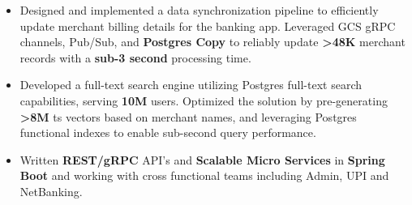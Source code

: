 \documentclass[10pt,a4paper,ragged2e]{classes/altacv}
\begin{document}
\tagline{ }

\begin{fullwidth}
\makecvheader
\end{fullwidth}





\begin{itemize}[itemsep=6pt]
\normalsize
\item Designed and implemented a data synchronization pipeline to efficiently update merchant billing details for the banking app. Leveraged GCS gRPC channels, Pub/Sub, and \textbf{Postgres Copy} to reliably update \textbf{>48K} merchant records with a \textbf{sub-3 second} processing time.

\item Developed a full-text search engine utilizing Postgres full-text search capabilities, serving \textbf{10M} users. Optimized the solution by pre-generating \textbf{>8M} ts vectors based on merchant names, and leveraging Postgres functional indexes to enable sub-second query performance.

\item Written \textbf{REST/gRPC} API's and \textbf{Scalable Micro Services} in \textbf{Spring Boot} and working with cross functional teams including Admin, UPI and NetBanking.

\end{itemize}
\vspace{6pt}
\end{document}
